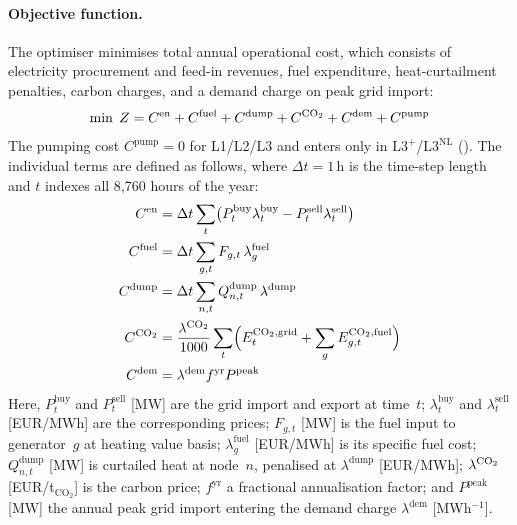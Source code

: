 \documentclass[a4paper,fleqn]{cas-dc}
\newcommand{\Lplus}{\mathrm{L3}^{+}}
\newcommand{\Lnl}{\mathrm{L3}^{\mathrm{NL}}}
\begin{document}
\paragraph{Objective function.}
The optimiser minimises total annual operational cost, which
consists of electricity procurement and feed-in revenues, fuel
expenditure, heat-curtailment penalties, carbon charges, and a
demand charge on peak grid import:
%
\begin{equation}
  \min \; Z = C^{\mathrm{en}} + C^{\mathrm{fuel}}
    + C^{\mathrm{dump}} + C^{\ce{CO2}} + C^{\mathrm{dem}}
    + C^{\mathrm{pump}}
  \label{eq:objective}
\end{equation}
%
The pumping cost $C^{\mathrm{pump}} = 0$ for L1/L2/L3 and enters
only in $\Lplus$/$\Lnl$ (). The individual
terms are defined as follows, where $\Delta t = 1\,\mathrm{h}$ is
the time-step length and $t$ indexes all 8{,}760 hours of the year:
%
\begin{align*}
C^{\mathrm{en}}   &= \Delta t \sum_t
  \bigl(P_t^{\mathrm{buy}} \lambda_t^{\mathrm{buy}}
        - P_t^{\mathrm{sell}} \lambda_t^{\mathrm{sell}}\bigr) \\
C^{\mathrm{fuel}} &= \Delta t \sum_{g,t}
  F_{g,t}\, \lambda_g^{\mathrm{fuel}} \\
C^{\mathrm{dump}} &= \Delta t \sum_{n,t}
  Q_{n,t}^{\mathrm{dump}}\, \lambda^{\mathrm{dump}} \\
C^{\ce{CO2}}      &= \frac{\lambda^{\ce{CO2}}}{1000} \sum_t
  \Bigl(E_t^{\ce{CO2},\mathrm{grid}} +
        \sum_g E_{g,t}^{\ce{CO2},\mathrm{fuel}}\Bigr) \\
C^{\mathrm{dem}}  &= \lambda^{\mathrm{dem}} f^{\mathrm{yr}}
  P^{\mathrm{peak}}
\end{align*}
%
Here, $P_t^{\mathrm{buy}}$ and $P_t^{\mathrm{sell}}$
[MW] are the grid import and export at time~$t$;
$\lambda_t^{\mathrm{buy}}$ and $\lambda_t^{\mathrm{sell}}$
[EUR/MWh] are the corresponding prices; $F_{g,t}$ [MW]
is the fuel input to generator~$g$ at heating value basis;
$\lambda_g^{\mathrm{fuel}}$ [EUR/MWh] is its specific fuel cost;
$Q_{n,t}^{\mathrm{dump}}$ [MW] is curtailed heat at node~$n$,
penalised at $\lambda^{\mathrm{dump}}$ [EUR/MWh];
$\lambda^{\ce{CO2}}$ [EUR/t$_{\mathrm{CO_2}}$] is the carbon
price; $f^{\mathrm{yr}}$ a fractional annualisation factor; and
$P^{\mathrm{peak}}$ [MW] the annual peak grid import entering the
demand charge $\lambda^{\mathrm{dem}}$ [MWh$^{-1}$].
\end{document}
